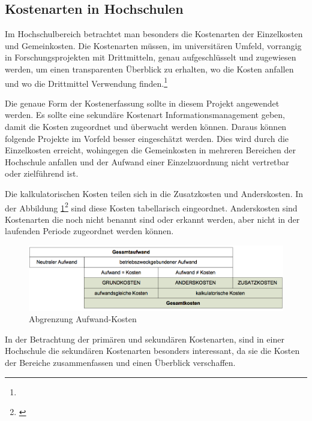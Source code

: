 
\clearpage

\subsection{Kostenarten in Hochschulen}
Im Hochschulbereich betrachtet man besonders die Kostenarten der Einzelkosten und Gemeinkosten. Die Kostenarten müssen, im universitären Umfeld, vorrangig in Forschungsprojekten mit Drittmitteln, genau aufgeschlüsselt und zugewiesen werden, um einen transparenten Überblick zu erhalten, wo die Kosten anfallen und wo die Drittmittel Verwendung finden.\footnote{}

Die genaue Form der Kostenerfassung sollte in diesem Projekt angewendet werden. Es sollte eine sekundäre Kostenart Informationsmanagement geben, damit die Kosten zugeordnet und überwacht werden können. Daraus können folgende Projekte im Vorfeld besser eingeschätzt werden. Dies wird durch die Einzelkosten erreicht, wohingegen die Gemeinkosten in mehreren Bereichen der Hochschule anfallen und der Aufwand einer Einzelzuordnung nicht vertretbar oder zielführend ist.

Die kalkulatorischen Kosten teilen sich in die Zusatzkosten und Anderskosten. In der Abbildung \ref{fig_abgrenzung_aufwand}\footnote{\autocite[9-10]{pkl_2005}} sind diese Kosten tabellarisch eingeordnet. Anderskosten sind Kostenarten die noch nicht benannt sind oder erkannt werden, aber nicht in der laufenden Periode zugeordnet werden können. 

\begin{figure}[h!]
	\centering
	\includegraphics[width=\textwidth]
	{kapitel/gruppe4_2/bilder/abgrenzung_aufwand}
	\caption{Abgrenzung Aufwand-Kosten}
	\label{fig_abgrenzung_aufwand}
\end{figure}

In der Betrachtung der primären und sekundären Kostenarten, sind in einer Hochschule die sekundären Kostenarten besonders interessant, da sie die Kosten der Bereiche zusammenfassen und einen Überblick verschaffen.

